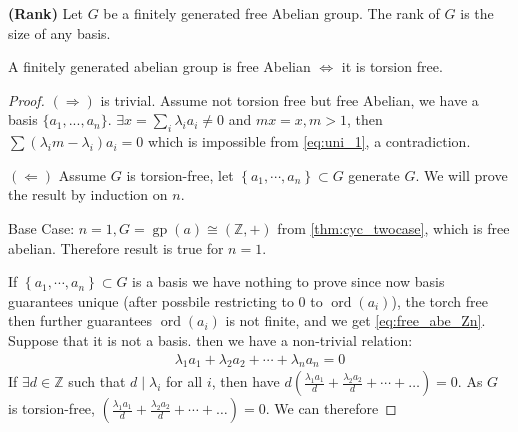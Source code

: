\documentclass{article}
\newcommand{\bfs}[1]{\textbf{({#1}) }}
\newcommand{\gp}{\operatorname{gp}}
\newcommand{\ord}{\operatorname{ord}}
\begin{document}
\begin{defa}{\bfs{Rank}}
 Let $G$ be a finitely generated free Abelian group. The rank of $G$ is the size of any basis.
\end{defa} 
\begin{thma}
A finitely generated abelian group is free Abelian $\Longleftrightarrow$ it is torsion free.
\end{thma} 
\begin{proof}
 $(\Rightarrow)$ is trivial. Assume not torsion free but free Abelian, we have a basis $\{a_1,...,a_n\}$. $\exists x=\sum_i \lambda_i a_i\ne 0$ and $mx=x,m>1$, then $\sum (\lambda_im-\lambda_i)a_i=0$ which is impossible from \cref{eq:uni_1}, a contradiction.
 
$(\Leftarrow)$
Assume $G$ is torsion-free, let $\left\{a_{1}, \cdots, a_{n}\right\} \subset G$ generate $G .$ We will prove the result by induction on $n$. 

Base Case: $n=1, G=\gp(a) \cong(\mathbb{Z},+)$ from \cref{thm:cyc_twocase}, which is free abelian. Therefore result is true for $n=1$.

If $\left\{a_{1}, \cdots, a_{n}\right\} \subset G$ is a basis we have nothing to prove since now basis guarantees unique (after possbile restricting to $0$ to $\ord(a_i)$), the torch free then further guarantees $\ord(a_i)$ is not finite, and we get \cref{eq:free_abe_Zn}.
Suppose that it is not a basis. then we have a non-trivial relation:
\begin{align*}
\lambda_{1} a_{1}+\lambda_{2} a_{2}+\cdots+\lambda_{n} a_{n}=0
\end{align*}
If $\exists d \in \mathbb{Z}$ such that $d \mid \lambda_{i}$ for all $i$, then have $d\left(\frac{\lambda_{1} a_{1}}{d}+\frac{\lambda_{2} a_{2}}{d}+\cdots+\ldots\right)=0 .$ As $G$ is torsion-free, $\left(\frac{\lambda_{1} a_{1}}{d}+\frac{\lambda_{2} a_{2}}{d}+\cdots+\ldots\right)=0 .$ We can therefore  


\end{proof}
\end{document}
